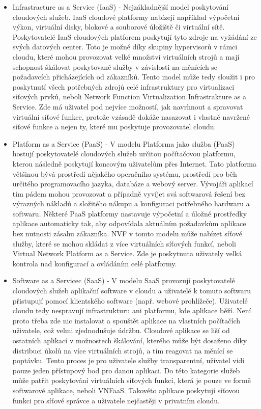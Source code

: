 \begin{itemize}
\item Infrastracture as a Service (IaaS) - Nejzákladnější  model  poskytování  cloudových  služeb. IaaS cloudové platformy nabízejí například výpočetní výkon, virtuální disky, blokové a souborové úložiště či virtuální sítě.  Poskytovatelé  IaaS  cloudových  platforem  poskytují tyto zdroje na vyžádání ze svých datových center. Toto je možné díky skupiny hypervisorů v rámci cloudu, které mohou provozovat velké množství virtuálních strojů  a  mají  schopnost  škálovat  poskytované  služby v  závislosti  na  měnících  se požadavcích přicházejících od zákazníků. Tento model může tedy sloužit i pro poskytnutí všech potřebných zdrojů celé infrastruktury pro virtualizaci síťových prvků, neboli Network Function Virtualization Infrastrakture as a Service. Zde má uživatel pod nejvíce možností, jak navrhnout a spravovat virtuální síťové funkce, protože vzásadě dokáže nasazovat i vlastně navržené síťové funkce a nejen ty, které mu poskytuje provozovatel cloudu.
\item Platform as a Service (PaaS) - V  modelu  Platforma  jako  služba  (PaaS)  hostují  poskytovatelé cloudových  služeb určitou počítačovou  platformu, kterou následně poskytují koncovým uživatelům přes Internet. Tato platforma většinou bývá prostředí nějakého operačního systému, prostředí  pro  běh  určitého programovacího  jazyka,  databáze  a  webový  server.  Vývojáři  aplikací tím pádem  mohou provozovat a případně vyvíjet svá softwarová řešení bez výrazných nákladů a složitého nákupu a konfiguraci potřebného hardwaru a softwaru. Některé PaaS platformy nastavuje výpočetní  a  úložné  prostředky  aplikace  automaticky  tak,  aby  odpovídala  aktuálním požadavkům aplikace bez nutnosti zásahu zákazníka. NVF v tomto modelu může nabízet síťové služby, které se mohou skládat z více virtuálních síťových funkcí, neboli Virtual Network Platform as a Service. Zde je poskytnuta uživately velká kontrola nad konfigurací a ovládáním celé platformy.
\item Software as a Servicec (SaaS) - V modelu SaaS provozují poskytovatelé cloudových služeb aplikační software v cloudu a uživatelé  k  tomuto  softwaru  přistupují  pomocí  klientského  software  (např.  webové prohlížeče). Uživatelé  cloudu tedy  nespravují infrastrukturu  ani platformu, kde aplikace běží.  Není  proto  třeba zde nic instalovat  a  spouštět  aplikace  na  vlastních  počítačích uživatele, což velmi zjednodušuje údržbu. Cloudové aplikace se liší od ostatních aplikací v možnostech  škálování, kterého  může  být  dosaženo  díky  distribuci  úkolů  na  více virtuálních strojů, a tím reagovat na měnící se poptávku. Tento proces je pro uživatele služby transparentní, uživatel vidí pouze jeden přístupový bod pro danou aplikaci. Do této kategorie služeb může patřit poskytování virtuálních síťových funkcí, která je pouze ve formě softwarové aplikace, neboli VNFaaS. Takovéto aplikace poskytují síťovou funkci pro síťové správce a uživatele nejčastěji v privatním cloudu. 
\end{itemize}

